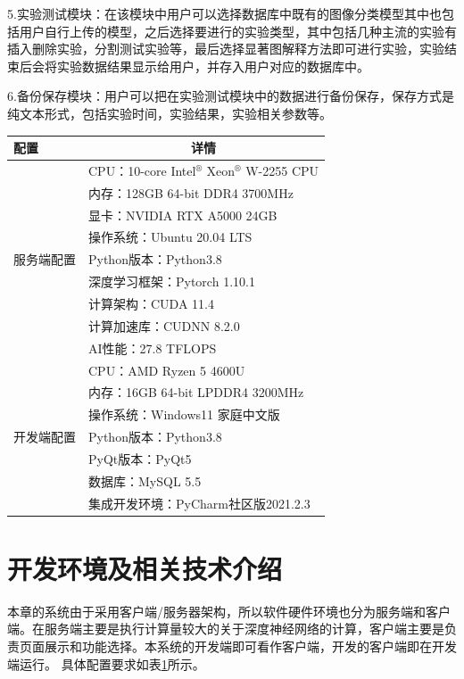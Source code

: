  5.实验测试模块：在该模块中用户可以选择数据库中既有的图像分类模型其中也包括用户自行上传的模型，之后选择要进行的实验类型，其中包括几种主流的实验有插入删除实验，分割测试实验等，最后选择显著图解释方法即可进行实验，实验结束后会将实验数据结果显示给用户，并存入用户对应的数据库中。
 
 6.备份保存模块：用户可以把在实验测试模块中的数据进行备份保存，保存方式是纯文本形式，包括实验时间，实验结果，实验相关参数等。

\begin{table}
	\renewcommand{\arraystretch}{1.5}
	\centering
	\label{tab:sys}
	\begin{tabular}{p{4cm}p{8cm}} 
		\hline
		配置                     & \multicolumn{1}{c}{详情}             \\ 
		\hline
		\multirow{9}{*}{服务端配置} & CPU：10-core Intel$^\circledR$ Xeon$^\circledR$ W-2255 CPU  \\
		& 内存：128GB 64-bit DDR4 3700MHz       \\
		& 显卡：NVIDIA RTX A5000 24GB           \\
		& 操作系统：Ubuntu 20.04 LTS              \\
		& Python版本：Python3.8                 \\
		& 深度学习框架：Pytorch 1.10.1              \\
		& 计算架构：CUDA 11.4                     \\
		& 计算加速库：CUDNN 8.2.0                  \\
		& AI性能：27.8 TFLOPS                   \\ 
		\hline
		\multirow{7}{*}{开发端配置} & CPU：AMD Ryzen 5 4600U              \\
		& 内存：16GB 64-bit LPDDR4 3200MHz      \\
		& 操作系统：Windows11 家庭中文版               \\
		& Python版本：Python3.8                 \\
		& PyQt版本：PyQt5                       \\
		& 数据库：MySQL 5.5                      \\
		& 集成开发环境：PyCharm社区版2021.2.3            \\
		\hline
	\end{tabular}
\end{table}

 
\section{开发环境及相关技术介绍}
本章的系统由于采用客户端/服务器架构，所以软件硬件环境也分为服务端和客户端。在服务端主要是执行计算量较大的关于深度神经网络的计算，客户端主要是负责页面展示和功能选择。本系统的开发端即可看作客户端，开发的客户端即在开发端运行。  具体配置要求如表\ref{tab:sys}所示。



